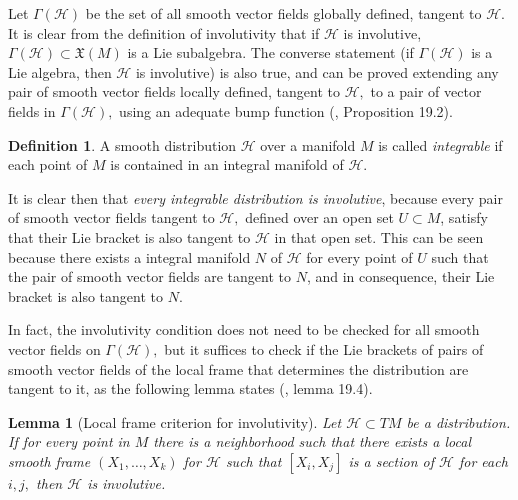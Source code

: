 \documentclass[12pt, letterpaper, reqno]{amsart}
\theoremstyle{definition}
\newtheorem{df}{Definition}
\theoremstyle{plain}
\newtheorem{lm}{Lemma}
\theoremstyle{remark}
\begin{document}
Let $ \Gamma(\mathcal{H}) $ be the set of all smooth vector fields globally defined, tangent to $ \mathcal{H}. $ It is clear from the definition of involutivity that if $ \mathcal{H} $ is involutive, $ \Gamma (\mathcal{H})\subset \mathfrak{X}(M) $ is a Lie subalgebra. The converse statement (if $ \Gamma(\mathcal{H}) $ is a Lie algebra, then $ \mathcal{H} $ is involutive) is also true, and can be proved extending any pair of smooth vector fields locally defined, tangent to $ \mathcal{H} ,$ to a pair of vector fields in $ \Gamma( \mathcal{H}), $ using an adequate bump function (\cite{lee2003introduction}, Proposition 19.2). 

\begin{df}
	A smooth distribution $ \mathcal{H} $ over a manifold $ M $ is called \textit{integrable} if each point of $ M $ is contained in an integral manifold of $ \mathcal{H}. $  
\end{df}
It is clear then that \textit{every integrable distribution is involutive}, because every pair of smooth vector fields tangent to $ \mathcal{H}, $ defined over an open set $ U\subset M $, satisfy that their Lie bracket is also tangent to $ \mathcal{H} $ in that open set. This can be seen because there exists a integral manifold $ N $  of $ \mathcal{H} $ for every point of $ U $ such that the pair of smooth vector fields are tangent to $ N $, and in consequence, their Lie bracket is also tangent to $ N. $  

In fact, the involutivity condition does not need to be checked for all smooth vector fields on $ \Gamma( \mathcal{H}), $ but it suffices to check if the Lie brackets of pairs of smooth vector fields of the local frame that determines the distribution are tangent to it, as the following lemma states (\cite{lee2003introduction}, lemma 19.4).

\begin{lm}[Local frame criterion for involutivity] 
	Let $ \mathcal{H}\subset TM $ be a distribution. If for every point in $ M $ there is a neighborhood such that there exists a local smooth frame $ (X_1,\dots, X_k) $ for $ \mathcal{H} $ such that $ [X_i,X_j] $ is a section of $ \mathcal{H} $ for each $ i,j, $ then $ \mathcal{H} $ is involutive.
\end{lm}
\end{document}

